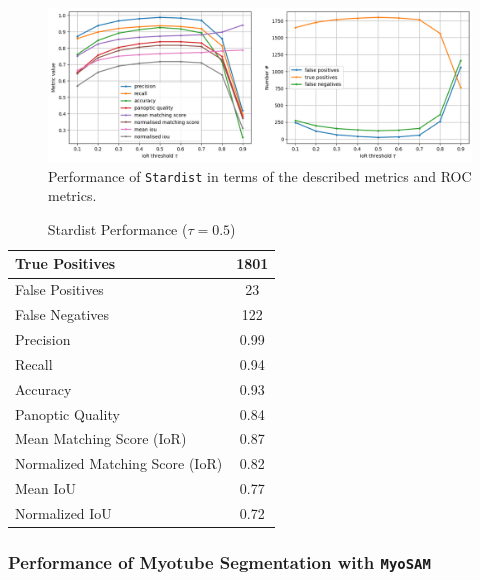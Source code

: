 \begin{figure}
	\centering
	\includegraphics[width=\textwidth]{"images/quantitative_performance_stardist.png"}
	\caption[Quantitative performance \texttt{Stardist}]{Performance of \texttt{Stardist} in terms of the described metrics and ROC metrics.}
	\label{figperfstardist}
\end{figure} 

\begin{table}[H]
	\centering
	\caption{Stardist Performance ($\tau = 0.5$)}
	\label{tabstardist}
	\begin{tabular}{|l|c|}
		\hline
		True Positives & 1801 \\
		\hline
		False Positives & 23 \\
		\hline
		False Negatives & 122 \\
		\hline
		Precision & 0.99 \\
		\hline
		Recall & 0.94 \\
		\hline
		Accuracy & 0.93 \\
		\hline
		Panoptic Quality & 0.84 \\
		\hline
		Mean Matching Score (IoR) & 0.87 \\
		\hline
		Normalized Matching Score (IoR) & 0.82 \\
		\hline
		Mean IoU & 0.77 \\
		\hline
		Normalized IoU & 0.72 \\
		\hline
	\end{tabular}
\end{table}

\subsubsection{Performance of Myotube Segmentation with \texttt{MyoSAM}}

